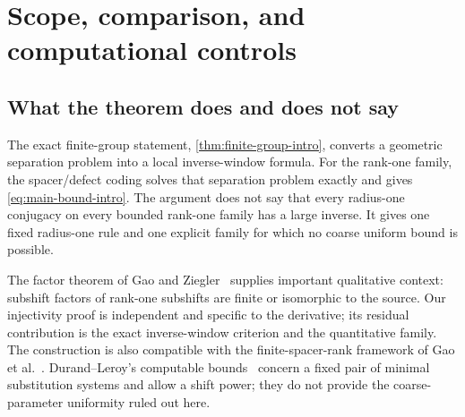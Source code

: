 \section{Scope, comparison, and computational controls}

\subsection{What the theorem does and does not say}
The exact finite-group statement, \cref{thm:finite-group-intro}, converts a
geometric separation problem into a local inverse-window formula.  For the
rank-one family, the spacer/defect coding solves that separation problem
exactly and gives \eqref{eq:main-bound-intro}.  The argument does not say that every
radius-one conjugacy on every bounded rank-one family has a large inverse.
It gives one fixed radius-one rule and one explicit family for which no
coarse uniform bound is possible.

The factor theorem of Gao and Ziegler~\cite{GaoZiegler2020} supplies important
qualitative context: subshift factors of rank-one subshifts are finite or
isomorphic to the source.  Our injectivity proof is independent and specific
to the derivative; its residual contribution is the exact inverse-window
criterion and the quantitative family.  The construction is also compatible
with the finite-spacer-rank framework of Gao et al.~\cite{GaoEtAl2025}.
Durand--Leroy's computable bounds~\cite{DurandLeroy2022} concern a fixed pair
of minimal substitution systems and allow a shift power; they do not provide
the coarse-parameter uniformity ruled out here.

